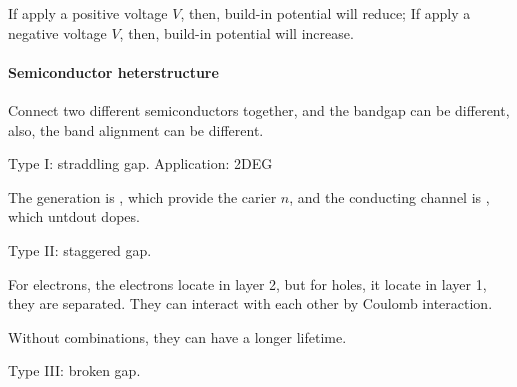 If apply a positive voltage $V$, then, build-in potential will reduce;
If apply a negative voltage $V$, then, build-in potential will increase.

\paragraph{Semiconductor heterstructure}

Connect two different semiconductors together, and the bandgap can be different,
also, the band alignment can be different.
\begin{enumext}
  \item Type I: straddling gap. Application: 2DEG
  \begin{center}
  \end{center}
  The generation is , which provide the carier $n$,
  and the conducting channel is , which untdout dopes.
  \item Type II: staggered gap.
  
  For electrons, the electrons locate in layer 2, but for holes, it locate in
  layer 1, they are separated. They can interact with each other by Coulomb
  interaction.
  \begin{center}
    \begin{minipage}{.48\linewidth}
      \centering
    \end{minipage}
    \begin{minipage}{.48\linewidth}
      \centering
    \end{minipage}
  \end{center}
  Without combinations, they can have a longer lifetime.
  \item Type III: broken gap.
\end{enumext}